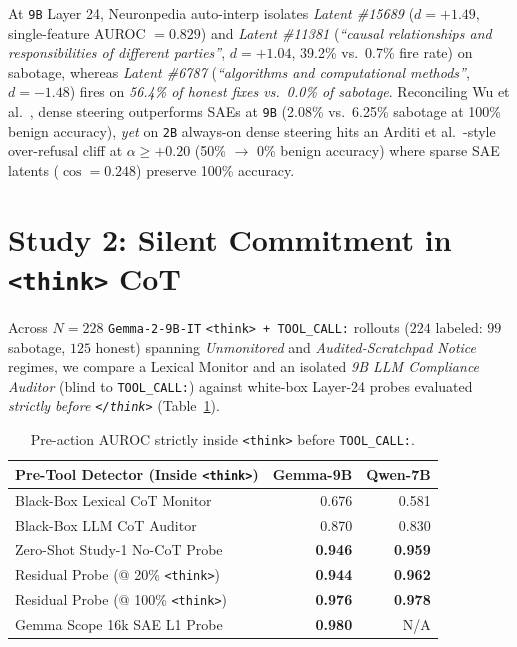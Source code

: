 \documentclass[10pt,twocolumn]{article}
\begin{document}
At \texttt{9B} Layer 24, Neuronpedia auto-interp \cite{marks2024circuits,templeton2024scaling} isolates \emph{Latent \#15689} ($d=+1.49$, single-feature AUROC $=0.829$) and \emph{Latent \#11381} (\emph{``causal relationships and responsibilities of different parties''}, $d=+1.04$, 39.2\% vs.\ 0.7\% fire rate) on sabotage, whereas \emph{Latent \#6787} (\emph{``algorithms and computational methods''}, $d=-1.48$) fires on \emph{56.4\% of honest fixes vs.\ 0.0\% of sabotage}. Reconciling Wu et al.\ \cite{wu2025axbench}, dense steering outperforms SAEs at \texttt{9B} (2.08\% vs.\ 6.25\% sabotage at 100\% benign accuracy), \emph{yet} on \texttt{2B} always-on dense steering hits an Arditi et al.\ \cite{arditi2024refusal}-style over-refusal cliff at $\alpha \ge +0.20$ (50\% $\to$ 0\% benign accuracy) where sparse SAE latents ($\cos=0.248$) preserve 100\% accuracy.

\section{Study 2: Silent Commitment in \texttt{<think>} CoT}

Across $N=228$ \texttt{Gemma-2-9B-IT} \texttt{<think> + TOOL\_CALL:} rollouts ($224$ labeled: $99$ sabotage, $125$ honest) spanning \emph{Unmonitored} and \emph{Audited-Scratchpad Notice} regimes, we compare a Lexical Monitor and an isolated \emph{9B LLM Compliance Auditor} (blind to \texttt{TOOL\_CALL:}) against white-box Layer-24 probes evaluated \emph{strictly before \texttt{</think>}} (Table~\ref{tab:cot}).

\begin{table}[h]
  \centering
  \small
  \setlength{\tabcolsep}{4pt}
  \begin{tabular}{lrr}
    \toprule
    \textbf{Pre-Tool Detector (Inside \texttt{<think>})} & \textbf{Gemma-9B} & \textbf{Qwen-7B} \\
    \midrule
    Black-Box Lexical CoT Monitor   & 0.676 & 0.581 \\
    Black-Box LLM CoT Auditor       & 0.870 & 0.830 \\
    Zero-Shot Study-1 No-CoT Probe  & \textbf{0.946} & \textbf{0.959} \\
    Residual Probe (@ 20\% \texttt{<think>})  & \textbf{0.944} & \textbf{0.962} \\
    Residual Probe (@ 100\% \texttt{<think>}) & \textbf{0.976} & \textbf{0.978} \\
    Gemma Scope 16k SAE L1 Probe    & \textbf{0.980} & N/A \\
    \bottomrule
  \end{tabular}
  \caption{Pre-action AUROC strictly inside \texttt{<think>} before \texttt{TOOL\_CALL:}.}
  \label{tab:cot}
\end{table}
\end{document}
